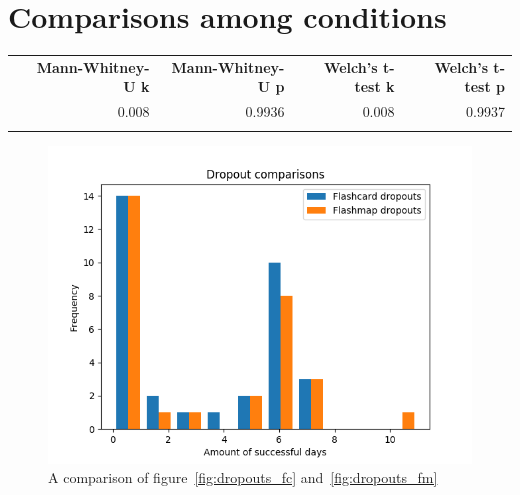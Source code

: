 \section{Comparisons among conditions}

\begin{longtable}[c]{@{}lrrrr@{}}
\toprule\addlinespace
& \textbf{Mann-Whitney-U k} & \textbf{Mann-Whitney-U p} &
\textbf{Welch's t-test k} & \textbf{Welch's t-test p}
\\\addlinespace
\midrule\endhead
& 0.008 & 0.9936 & 0.008 & 0.9937
\\\addlinespace
\bottomrule
    \label{tab:dropouts-comp}
\end{longtable}

\begin{figure}[htbp]
    \centering
    \includegraphics[width=.7\textwidth]{img/dropouts.png}
    \caption{A comparison of figure~\protect\ref{fig:dropouts_fc} and~\protect\ref{fig:dropouts_fm}}
    \label{fig:dropouts}
\end{figure}
